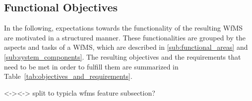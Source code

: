 
\subsection{Functional Objectives} %
  \label{sub:functional_objectives}

  In the following, expectations towards the functionality of the resulting \ac{WfMS} are motivated in a structured manner. These functionalities are grouped by the aspects and tasks of a \ac{WfMS}, which are described in \ref{sub:functional_areas} and \ref{sub:system_components}. The resulting objectives and the requirements that need to be met in order to fulfill them are summarized in Table~\ref{tab:objectives_and_requirements}.


  <-><-> split to typicla wfms feature subsection?

